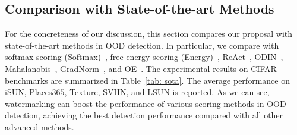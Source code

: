 \documentclass{article}
\begin{document}
\subsection{Comparison with State-of-the-art Methods}

For the concreteness of our discussion, this section compares our proposal with state-of-the-art methods in OOD detection. In particular, we compare with softmax scoring (Softmax)~\cite{hendrycks2016baseline}, free energy scoring (Energy)~\cite{liu2020energy}, ReAct~\cite{sun2021react}, ODIN~\cite{LiangLS18}, Mahalanobis~\cite{lee2018simple}, GradNorm~\cite{huang2021importance}, and OE~\cite{HendrycksMD19}. The experimental results on CIFAR benchmarks are summarized in Table~\ref{tab: sota}. The average performance on iSUN, Places$365$, Texture, SVHN, and LSUN is reported. As we can see, watermarking can boost the performance of various scoring methods in OOD detection, achieving the best detection performance compared with all other advanced methods. 
\end{document}
